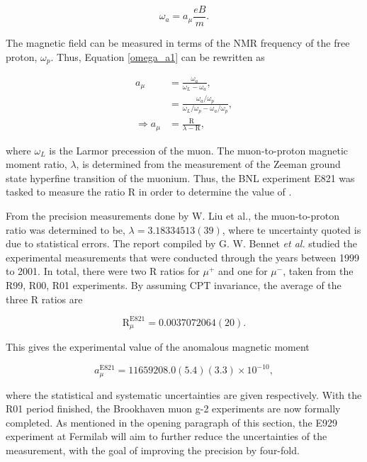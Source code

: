 \documentclass{article}
\numberwithin{equation}{section} %
\begin{document}
\begin{equation}
\omega_a=a_\mu\frac{eB}{m}.
\label{omega_a1}
\end{equation}

The magnetic field can be measured in terms of the NMR frequency of the free proton, $\omega_p$. Thus, Equation \ref{omega_a1} can be rewritten as

\begin{equation}
\begin{split}
a_\mu &= \frac{\omega_a}{\omega_L-\omega_a},\\
&= \frac{\omega_a/\omega_p}{\omega_L/\omega_p-\omega_a/\omega_p},\\
\Rightarrow a_\mu&= \frac{\mathrm{R}}{\lambda-\mathrm{R}},
\end{split}
\end{equation}

\noindent where $\omega_L$ is the Larmor precession of the muon. The muon-to-proton magnetic moment ratio, $\lambda$, is determined from the measurement of the Zeeman ground state hyperfine transition of the muonium\cite{muon_hyperfine}. Thus, the BNL experiment E821 was tasked to measure the ratio R in order to determine the value of \amu.

From the precision measurements done by W. Liu et al.\cite{muon_hyperfine}, the muon-to-proton ratio was determined to be, $\lambda =3.183 345 13(39)$, where te uncertainty quoted is due to statistical errors. The report compiled by G. W. Bennet \textit{et al.}\cite{bnl} studied the experimental measurements that were conducted through the years between 1999 to 2001. In total, there were two R ratios for $\mu^+$ and one for $\mu^-$, taken from the R99, R00, R01 experiments. By assuming CPT invariance, the average of the three R ratios are

\begin{equation}
\mathrm{R}_\mu^{\mathrm{E821}} = 0.003 707 206 4(2 0).
\end{equation}

\noindent This gives the experimental value of the anomalous magnetic moment\cite{millerg2}

\begin{equation}
a_\mu^{\mathrm{E821}} = 11 659 208.0(5.4)(3.3) \times 10^{-10},
\label{a_mu exp}
\end{equation}

\noindent where the statistical and systematic uncertainties are given respectively. With the R01 period finished, the Brookhaven muon g-2 experiments are now formally completed. As mentioned in the opening paragraph of this section, the E929 experiment at Fermilab will aim to further reduce the uncertainties of the \amu measurement, with the goal of improving the precision by four-fold\cite{fermilab}.
\end{document}
